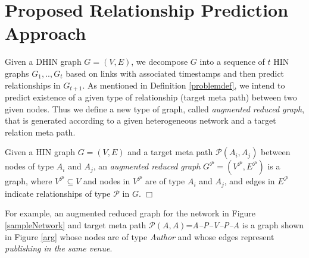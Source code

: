 \section{Proposed Relationship Prediction Approach}

Given a DHIN graph $G=(V,E)$, we decompose $G$ into a sequence of $t$ HIN graphs ${G_1, .., G_t}$ based on links with associated timestamps and then predict relationships in $G_{t+1}$. As mentioned in Definition \ref{problemdef}, we intend to predict existence of a given type of relationship (target meta path) between two given nodes. Thus we define a new type of graph, called \textit{augmented reduced graph}, that is generated according to a given heterogeneous network and a target relation meta path. 


\begin{definition}\label{def:ARG}
Given a HIN graph $G=(V,E)$ and a target meta path $\mathcal{P}(A_i,A_j)$ between nodes of type $A_i$ and $A_j$, an \textit{augmented reduced graph} $G^\mathcal{P}=(V^\mathcal{P},E^\mathcal{P})$ is a graph, where $V^\mathcal{P} \subseteq V$ and nodes in $V^\mathcal{P}$ are of type $A_i$ and $A_j$, and edges in $E^\mathcal{P}$ indicate relationships of type $\mathcal{P}$ in $G$. $\Box$
\end{definition}


For example, an augmented reduced graph for the network in Figure \ref{sampleNetwork} and target meta path $\mathcal{P}(A,A)$=\textit{A--P--V--P--A} is a graph shown in Figure \ref{arg} whose nodes are of type \textit{Author} and whose edges represent \textit{publishing in the same venue}. %


